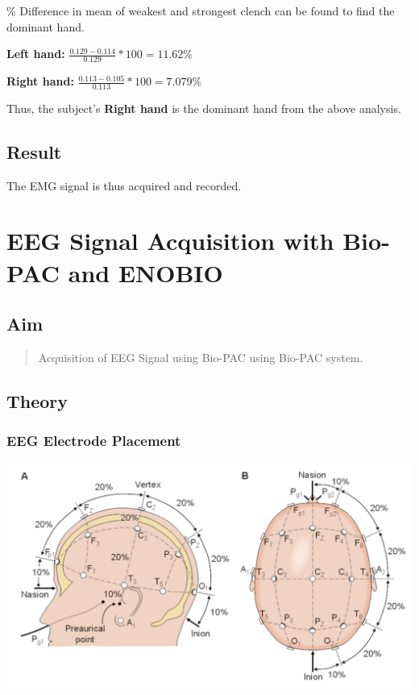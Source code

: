 \documentclass[
  11pt,
  letterpaper,
  DIV=11,
  numbers=noendperiod]{scrreprt}
\begin{document}
\% Difference in mean of weakest and strongest clench can be found to
find the dominant hand.

\textbf{Left hand:} \(\frac{0.129 - 0.114}{0.129} * 100 = 11.62\%\)

\textbf{Right hand:} \(\frac{0.113 - 0.105}{0.113} * 100 = 7.079\%\)

Thus, the subject's \textbf{Right hand} is the dominant hand from the
above analysis.

\section{Result}\label{result-2}

The EMG signal is thus acquired and recorded.


\chapter{EEG Signal Acquisition with Bio-PAC and
ENOBIO}\label{eeg-signal-acquisition-with-bio-pac-and-enobio}

\section{Aim}\label{aim-3}

\begin{quote}
Acquisition of EEG Signal using Bio-PAC using Bio-PAC system.
\end{quote}

\section{Theory}\label{theory-3}

\subsection{EEG Electrode Placement}\label{eeg-electrode-placement}

\includegraphics[width=5.63542in,height=\textheight]{images/clipboard-1080795871.png}
\end{document}
